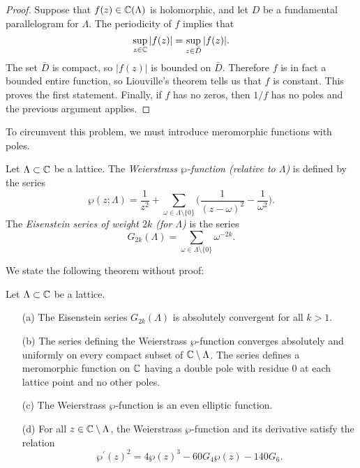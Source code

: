 \begin{proof}
	Suppose that $f(z)\in \mathbb{C}(\Lambda)$ is holomorphic, and let $D$ be a fundamental parallelogram for $\Lambda$. The periodicity of $f$ implies that
	\begin{equation*}
		\sup_{z\in\mathbb{C}}|f(z)| = \sup_{z \in \bar{D}}|f(z)|.
	\end{equation*}
	The set $\bar{D}$ is compact, so $|f(z)|$ is bounded on $\bar{D}$. Therefore $f$ is in fact a bounded entire function, so Liouville's theorem tells us that $f$ is constant. This proves the first statement. Finally, if $f$ has no zeros, then $1/f$ has no poles and the previous argument applies.
\end{proof}

To circumvent this problem, we must introduce meromorphic functions with poles.\\

\begin{defn}
	Let $\Lambda \subset \mathbb{C}$ be a lattice. The \emph{Weierstrass $\wp$-function (relative to $\Lambda$)} is defined by the series
	\begin{equation*}
		\wp(z;\Lambda) = \frac{1}{z^{2}} + \sum_{\omega\in \Lambda\setminus\{0\}}\bigg(\frac{1}{(z-\omega)^{2}} - \frac{1}{\omega^{2}}\bigg).
	\end{equation*}
	The \emph{Eisenstein series of weight $2k$ (for $\Lambda$)} is the series
	\begin{equation*}
		G_{2k}(\Lambda) = \sum_{\omega\in\Lambda\setminus\{0\}}\omega^{-2k}.
	\end{equation*}
\end{defn}

We state the following theorem without proof:\\

\begin{theorem}
	Let $\Lambda \subset \mathbb{C}$ be a lattice.
	\begin{enumerate}
		\item[(a)] The Eisenstein series $G_{2k}(\Lambda)$ is absolutely convergent for all $k > 1$.
		\item[(b)] The series defining the Weierstrass $\wp$-function converges absolutely and uniformly on every compact subset of $\mathbb{C} \setminus\Lambda$. The series defines a meromorphic function on $\mathbb{C}$ having a double pole with residue $0$ at each lattice point and no other poles.
		\item[(c)] The Weierstrass $\wp$-function is an even elliptic function.
		\item[(d)] For all $z \in \mathbb{C}\setminus\Lambda$, the Weierstrass $\wp$-function and its derivative satisfy the relation
		\begin{equation}
		\label{weierstrass_legendre}
			\wp^{\prime}(z)^{2} = 4\wp(z)^{3} - 60G_{4}\wp(z) - 140G_{6}.
		\end{equation}
	\end{enumerate}
\end{theorem}

